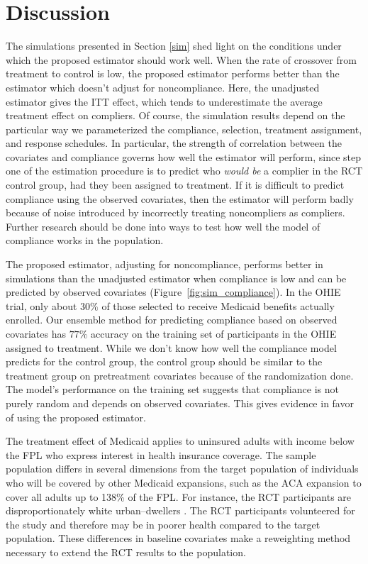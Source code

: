 \documentclass[12pt]{article}
\begin{document}
\section{Discussion}

The simulations presented in Section \ref{sim} shed light on the conditions under which the proposed estimator should work well.  When the rate of crossover from treatment to control is low, the proposed estimator performs better than the estimator which doesn't adjust for noncompliance.  Here, the unadjusted estimator gives the ITT effect, which tends to underestimate the average treatment effect on compliers. Of course, the simulation results depend on the particular way we parameterized the compliance, selection, treatment assignment, and response schedules.  In particular, the strength of correlation between the covariates and compliance governs how well the estimator will perform, since step one of the estimation procedure is to predict who \textit{would be} a complier in the RCT control group, had they been assigned to treatment. If it is difficult to predict compliance using the observed covariates, then the estimator will perform badly because of noise introduced by incorrectly treating noncompliers as compliers.  Further research should be done into ways to test how well the model of compliance works in the population. 

The proposed estimator, adjusting for noncompliance, performs better in simulations than the unadjusted estimator when compliance is low and can be predicted by observed covariates (Figure~\ref{fig:sim_compliance}).  In the OHIE trial, only about $30\%$ of those selected to receive Medicaid benefits actually enrolled. Our ensemble method for predicting compliance based on observed covariates has $77\%$ accuracy on the training set of participants in the OHIE assigned to treatment.  While we don't know how well the compliance model predicts for the control group, the control group should be similar to the treatment group on pretreatment covariates because of the randomization done.  The model's performance on the training set suggests that compliance is not purely random and depends on observed covariates.  This gives evidence in favor of using the proposed estimator.  

The treatment effect of Medicaid applies to uninsured adults with income below the FPL who express interest in health insurance coverage. The sample population differs in several dimensions from the target population of individuals who will be covered by other Medicaid expansions, such as the ACA expansion to cover all adults up to 138\% of the FPL. For instance, the RCT participants are disproportionately white urban--dwellers \citep{Taubman}. The RCT participants volunteered for the study and therefore may be in poorer health compared to the target population. These differences in baseline covariates make a reweighting method necessary to extend the RCT results to the population. 
\end{document}
